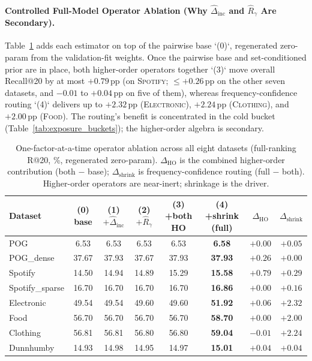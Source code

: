\paragraph{Controlled Full-Model Operator Ablation (Why $\hat{\Delta}_{\text{inc}}$ and $\hat{R}_{\gamma}$ Are Secondary).}
Table~\ref{tab:ablation} adds each estimator on top of the pairwise base `(0)`, regenerated zero-param from the
validation-fit weights. Once the pairwise base and set-conditioned prior are in place, both higher-order operators
together `(3)` move overall Recall@20 by at most $+0.79$\,pp (on \textsc{Spotify}; ${\le}+0.26$\,pp on the other seven
datasets, and $-0.01$ to $+0.04$\,pp on five of them), whereas frequency-confidence routing `(4)` delivers up to
$+2.32$\,pp (\textsc{Electronic}), $+2.24$\,pp (\textsc{Clothing}), and $+2.00$\,pp (\textsc{Food}). The routing's
benefit is concentrated in the cold bucket (Table~\ref{tab:exposure_buckets}); the higher-order algebra is secondary.

\begin{table}[t]\centering\small
\caption{One-factor-at-a-time operator ablation across all eight datasets (full-ranking R@20, \%, regenerated
zero-param). $\Delta_{\text{HO}}$ is the combined higher-order contribution (both $-$ base); $\Delta_{\text{shrink}}$
is frequency-confidence routing (full $-$ both). Higher-order operators are near-inert; shrinkage is the driver.}
\label{tab:ablation}
\setlength{\tabcolsep}{4.0pt}
\begin{tabular}{lccccccc}
\toprule
Dataset & (0) base & (1) $+\hat{\Delta}_{\text{inc}}$ & (2) $+\hat{R}_{\gamma}$ & (3) +both HO & (4) +shrink (full) & $\Delta_{\text{HO}}$ & $\Delta_{\text{shrink}}$ \\
\midrule
POG             &  6.53 &  6.53 &  6.53 &  6.53 & \textbf{6.58}  & $+0.00$ & $+0.05$ \\
POG\_dense      & 37.67 & 37.93 & 37.67 & 37.93 & \textbf{37.93} & $+0.26$ & $+0.00$ \\
Spotify         & 14.50 & 14.94 & 14.89 & 15.29 & \textbf{15.58} & $+0.79$ & $+0.29$ \\
Spotify\_sparse & 16.70 & 16.70 & 16.70 & 16.70 & \textbf{16.86} & $+0.00$ & $+0.16$ \\
Electronic      & 49.54 & 49.54 & 49.60 & 49.60 & \textbf{51.92} & $+0.06$ & $+2.32$ \\
Food            & 56.70 & 56.70 & 56.70 & 56.70 & \textbf{58.70} & $+0.00$ & $+2.00$ \\
Clothing        & 56.81 & 56.81 & 56.80 & 56.80 & \textbf{59.04} & $-0.01$ & $+2.24$ \\
Dunnhumby       & 14.93 & 14.98 & 14.95 & 14.97 & \textbf{15.01} & $+0.04$ & $+0.04$ \\
\bottomrule
\end{tabular}
\end{table}


